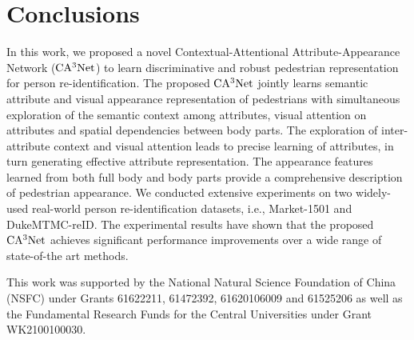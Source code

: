 \documentclass[sigconf]{acmart}
\begin{document}
\section{Conclusions}
In this work, we proposed a novel Contextual-Attentional Attribute-Appearance Network ($\rm CA^3Net$) to learn discriminative and robust pedestrian representation for person re-identification. The proposed $\rm CA^3Net$ jointly learns semantic attribute and visual appearance representation of pedestrians with simultaneous exploration of the semantic context among attributes, visual attention on attributes and spatial dependencies between body parts. The exploration of inter-attribute context and visual attention leads to precise learning of attributes, in turn generating effective attribute representation. The appearance features learned from both full body and body parts provide a comprehensive description of pedestrian appearance. We conducted extensive experiments on two widely-used real-world person re-identification datasets, i.e., Market-1501 and DukeMTMC-reID. The experimental results have shown that the proposed $\rm CA^3Net$  achieves significant performance improvements over a wide range of state-of-the art methods.

\begin{acks}
This work was supported by the National Natural Science Foundation of China (NSFC) under Grants 61622211, 61472392, 61620106009 and 61525206 as well as the Fundamental Research Funds for the Central Universities under Grant WK2100100030. 
\end{acks}%



\end{document}
